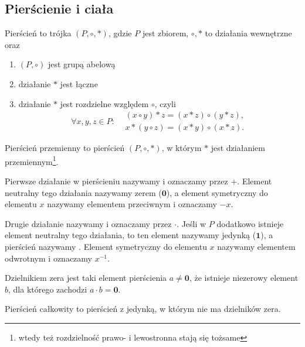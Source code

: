 \subsection{Pierścienie i ciała}
\begin{definition}
    Pierścień to trójka $(P, \circ, *)$, gdzie $P$ jest zbiorem, $\circ, *$ to działania wewnętrzne oraz
    \begin{enumerate}
        \item $(P, \circ)$ jest grupą abelową
        \item działanie $*$ jest łączne
        \item działanie $*$ jest rozdzielne względem $\circ$, czyli
        $$\forall x, y, z \in P : \begin{aligned}& (x \circ y) * z = (x * z) \circ (y * z), \\
                                                 & x * (y \circ z) = (x * y) \circ (x * z).\end{aligned} $$
    \end{enumerate}
\end{definition}

\begin{definition}
    Pierścień przemienny to pierścień $(P, \circ, *)$, w którym $*$ jest działaniem przemiennym\footnote{wtedy też rozdzielność prawo- i lewostronna stają się tożsame}.
\end{definition}

Pierwsze działanie w pierścieniu nazywamy  i oznaczamy przez $+$. Element neutralny tego działania nazywamy zerem ($\mathbf{0}$), a element symetryczny do elementu $x$ nazywamy elementem przeciwnym i oznaczamy $-x$.

Drugie działanie nazywamy  i oznaczamy przez $\cdot$. Jeśli w $P$ dodatkowo istnieje element neutralny tego działania, to ten element nazywamy jedynką ($\mathbf{1}$), a pierścień nazywamy . Element symetryczny do elementu $x$ nazywamy elementem odwrotnym i oznaczamy $x^{-1}$.

\begin{definition}
    Dzielnikiem zera jest taki element pierścienia $a \neq \mathbf{0}$, że istnieje niezerowy element $b$, dla którego zachodzi $a \cdot b = \mathbf{0}$.
\end{definition}

\begin{definition}
    Pierścień całkowity to pierścień z jedynką, w którym nie ma dzielników zera.
\end{definition}

